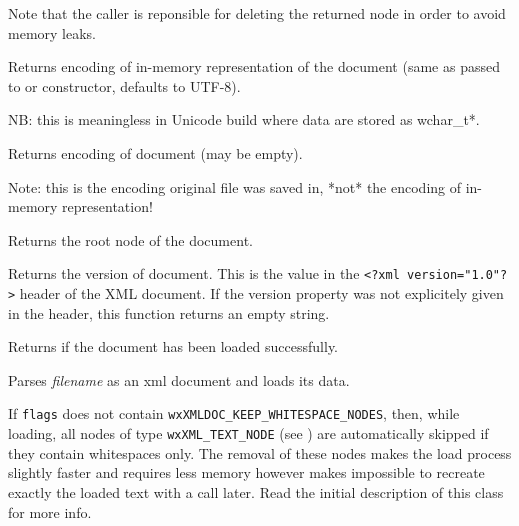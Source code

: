 Note that the caller is reponsible for deleting the returned node in order to avoid memory leaks.


\label{wxxmldocumentgetencoding}


Returns encoding of in-memory representation of the document
(same as passed to  or constructor, defaults to UTF-8).

NB: this is meaningless in Unicode build where data are stored as wchar\_t*.


\label{wxxmldocumentgetfileencoding}


Returns encoding of document (may be empty).

Note: this is the encoding original file was saved in, *not* the
encoding of in-memory representation!


\label{wxxmldocumentgetroot}


Returns the root node of the document.


\label{wxxmldocumentgetversion}


Returns the version of document.
This is the value in the {\tt <?xml version="1.0"?>} header of the XML document.
If the version property was not explicitely given in the header, this function
returns an empty string.


\label{wxxmldocumentisok}


Returns \true if the document has been loaded successfully.


\label{wxxmldocumentload}


Parses {\it filename} as an xml document and loads its data.

If {\tt flags} does not contain {\tt wxXMLDOC_KEEP_WHITESPACE_NODES}, then, while loading, all nodes of
type {\tt wxXML_TEXT_NODE} (see ) are automatically skipped if they
contain whitespaces only.
The removal of these nodes makes the load process slightly faster and requires less memory however
makes impossible to recreate exactly the loaded text with a  call later.
Read the initial description of this class for more info.

